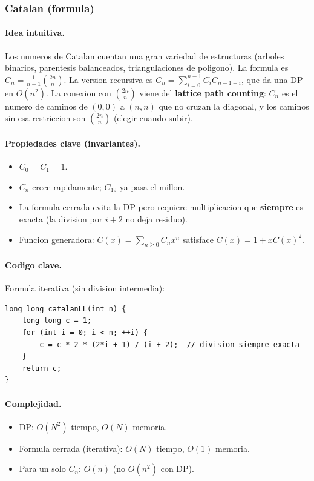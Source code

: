 ﻿\subsubsection{Catalan (formula)}

\paragraph{Idea intuitiva.}
Los numeros de Catalan cuentan una gran variedad de estructuras (arboles binarios, parentesis balanceados, triangulaciones de poligono). La formula es $C_n = \frac{1}{n+1}\binom{2n}{n}$. La version recursiva es $C_n = \sum_{i=0}^{n-1} C_i C_{n-1-i}$, que da una DP en $O(n^2)$. La conexion con $\binom{2n}{n}$ viene del \textbf{lattice path counting}: $C_n$ es el numero de caminos de $(0,0)$ a $(n,n)$ que no cruzan la diagonal, y los caminos sin esa restriccion son $\binom{2n}{n}$ (elegir cuando subir).

\paragraph{Propiedades clave (invariantes).}
\begin{itemize}\setlength\itemsep{0pt}
	\item $C_0 = C_1 = 1$.
	\item $C_n$ crece rapidamente; $C_{19}$ ya pasa el millon.
	\item La formula cerrada evita la DP pero requiere multiplicacion que \textbf{siempre} es exacta (la division por $i+2$ no deja residuo).
	\item Funcion generadora: $C(x) = \sum_{n \ge 0} C_n x^n$ satisface $C(x) = 1 + x C(x)^2$.
\end{itemize}

\paragraph{Codigo clave.}
Formula iterativa (sin division intermedia):
\begin{verbatim}
long long catalanLL(int n) {
    long long c = 1;
    for (int i = 0; i < n; ++i) {
        c = c * 2 * (2*i + 1) / (i + 2);  // division siempre exacta
    }
    return c;
}
\end{verbatim}

\paragraph{Complejidad.}
\begin{itemize}\setlength\itemsep{0pt}
	\item DP: $O(N^2)$ tiempo, $O(N)$ memoria.
	\item Formula cerrada (iterativa): $O(N)$ tiempo, $O(1)$ memoria.
	\item Para un solo $C_n$: $O(n)$ (no $O(n^2)$ con DP).
\end{itemize}

